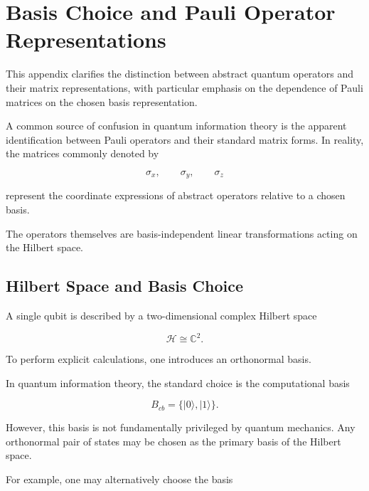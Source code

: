 
\chapter{Basis Choice and Pauli Operator Representations}

This appendix clarifies the distinction between abstract quantum operators and their matrix representations, with particular emphasis on the dependence of Pauli matrices on the chosen basis representation.

\medskip

A common source of confusion in quantum information theory is the apparent identification between Pauli operators and their standard matrix forms. In reality, the matrices commonly denoted by

\[
\sigma_x,
\qquad
\sigma_y,
\qquad
\sigma_z
\]

represent the coordinate expressions of abstract operators relative to a chosen basis.

The operators themselves are basis-independent linear transformations acting on the Hilbert space.


\section*{Hilbert Space and Basis Choice}

A single qubit is described by a two-dimensional complex Hilbert space

\[
\mathcal H \cong \mathbb C^2.
\]

To perform explicit calculations, one introduces an orthonormal basis.

In quantum information theory, the standard choice is the computational basis

\[
B_{cb}
=
\{
|0\rangle,
|1\rangle
\}.
\]

However, this basis is not fundamentally privileged by quantum mechanics. Any orthonormal pair of states may be chosen as the primary basis of the Hilbert space.

\medskip

For example, one may alternatively choose the basis

